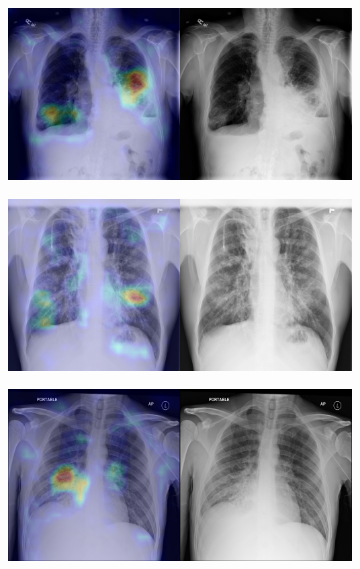 \begin{figure}[b]
\begin{subfigure}{0.4\textwidth}
    \end{subfigure}
    \begin{subfigure}{0.4\textwidth}
        \centering
        \includegraphics[width=1.0\textwidth]{Chapters/5. Conclusiones/img/Pneumonia/1_1_2e4b20f7-69c4-4680-9c8b-6984c195b1cf.png}
    \end{subfigure}
    \begin{subfigure}{0.4\textwidth}
        \centering
        \includegraphics[width=1.0\textwidth]{Chapters/5. Conclusiones/img/Pneumonia/1_1_2a4489f6-6f7b-46f5-a937-281206307943.png}
    \end{subfigure}
    \begin{subfigure}{0.4\textwidth}
        \centering
        \includegraphics[width=1.0\textwidth]{Chapters/5. Conclusiones/img/Pneumonia/1_1_1f447431-e2b3-4d18-8c22-30684ab71ffb.png}

\end{subfigure}
\end{figure}
